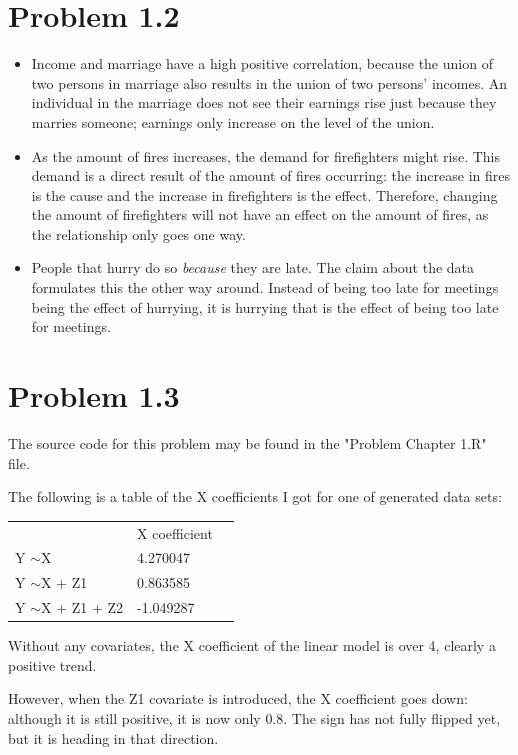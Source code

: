 \documentclass[a4paper]{article}
\begin{document}
\section*{Problem 1.2}
\begin{itemize}
    \item Income and marriage have a high positive correlation, because the union of two persons in marriage also results in the union of two persons' incomes.
    An individual in the marriage does not see their earnings rise just because they marries someone; 
    earnings only increase on the level of the union.
    \item As the amount of fires increases, the demand for firefighters might rise. 
    This demand is a direct result of the amount of fires occurring: the increase in fires is the cause and the increase in firefighters is the effect.
    Therefore, changing the amount of firefighters will not have an effect on the amount of fires, as the relationship only goes one way.
    \item People that hurry do so \textit{because} they are late. 
    The claim about the data formulates this the other way around. 
    Instead of being too late for meetings being the effect of hurrying, 
    it is hurrying that is the effect of being too late for meetings.
\end{itemize}

\section*{Problem 1.3}
The source code for this problem may be found in the "Problem Chapter 1.R" file.

The following is a table of the X coefficients I got for one of generated data sets:
\begin{table}[]
    \begin{tabular}{lll}
                        & X coefficient &  \\
    Y $\sim$X           & 4.270047 &  \\
    Y $\sim$X + Z1      & 0.863585 &  \\
    Y $\sim$X + Z1 + Z2 & -1.049287 & 
    \end{tabular}
    \end{table}

Without any covariates, the X coefficient of the linear model is over 4, clearly a positive trend.

However, when the Z1 covariate is introduced, the X coefficient goes down: 
although it is still positive, it is now only 0.8.
The sign has not fully flipped yet, but it is heading in that direction.
\end{document}
